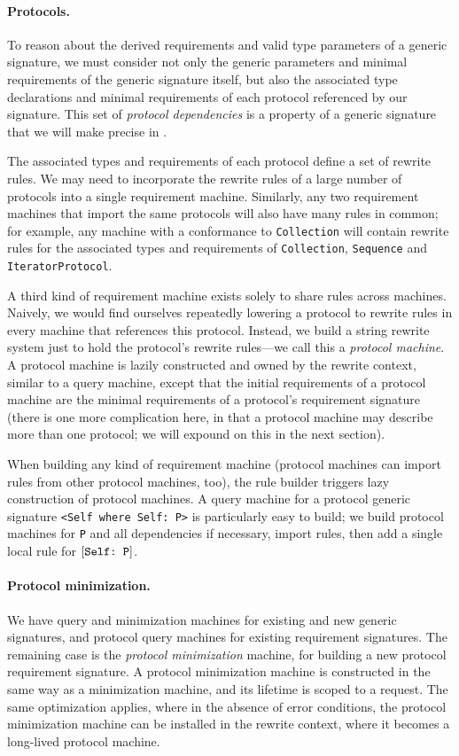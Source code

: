 \documentclass[../generics]{subfiles}
\begin{document}
\paragraph{Protocols.}
To reason about the derived requirements and valid type parameters of a generic signature, we must consider not only the generic parameters and minimal requirements of the generic signature itself, but also the associated type declarations and minimal requirements of each protocol referenced by our signature. This set of \emph{protocol dependencies} is a property of a generic signature that we will make precise in .

The associated types and requirements of each protocol define a set of rewrite rules. We may need to incorporate the rewrite rules of a large number of protocols into a single requirement machine. Similarly, any two requirement machines that import the same protocols will also have many rules in common; for example, any machine with a conformance to \texttt{Collection} will contain rewrite rules for the associated types and requirements of \texttt{Collection}, \texttt{Sequence} and \texttt{IteratorProtocol}.

A third kind of requirement machine exists solely to share rules across machines. Naively, we would find ourselves repeatedly lowering a protocol to rewrite rules in every machine that references this protocol. Instead, we build a string rewrite system just to hold the protocol's rewrite rules---we call this a \emph{protocol machine}. A protocol machine is lazily constructed and owned by the rewrite context, similar to a query machine, except that the initial requirements of a protocol machine are the minimal requirements of a protocol's requirement signature (there is one more complication here, in that a protocol machine may describe more than one protocol; we will expound on this in the next section).

When building any kind of requirement machine (protocol machines can import rules from other protocol machines, too), the rule builder triggers lazy construction of protocol machines. A query machine for a protocol generic signature \verb|<Self where Self: P>| is particularly easy to build; we build protocol machines for \texttt{P} and all dependencies if necessary, import rules, then add a single local rule for $[\texttt{Self:~P}]$.

\paragraph{Protocol minimization.}
We have query and minimization machines for existing and new generic signatures, and protocol query machines for existing requirement signatures. The remaining case is the \emph{protocol minimization} machine, for building a new protocol requirement signature. A protocol minimization machine is constructed in the same way as a minimization machine, and its lifetime is scoped to a request. The same optimization applies, where in the absence of error conditions, the protocol minimization machine can be installed in the rewrite context, where it becomes a long-lived protocol machine.
\end{document}
